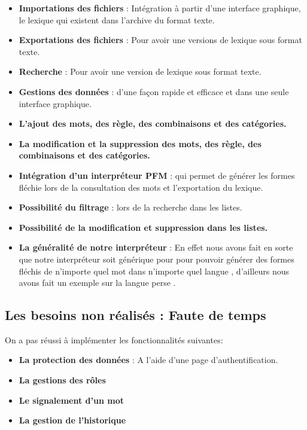 \documentclass[12pt,a4paper]{article}
\begin{document}
\begin{itemize}
\item \textbf{Importations des fichiers} : Intégration à partir d'une interface graphique, le lexique qui existent dans l'archive du format texte.
\item \textbf{Exportations des fichiers} : Pour avoir une versions de lexique sous format texte.
\item \textbf{Recherche} : Pour avoir une version de lexique sous format texte.
\item \textbf{Gestions des données} : d'une façon rapide et efficace et dans une seule interface graphique.


\item \textbf{L'ajout des mots, des règle, des combinaisons et des catégories.}


\item \textbf{ La modification et la suppression des mots, des règle, des combinaisons et des catégories.}
\item \textbf{Intégration d'un interpréteur PFM } : qui permet de générer les formes fléchie lors de la consultation des mots et l'exportation du lexique.
\item \textbf{Possibilité du filtrage} : lors de la recherche dans les listes.
\item \textbf{Possibilité de la modification et suppression dans les listes.}
\item \textbf{La généralité de notre interpréteur} : En effet nous avons fait en sorte que notre interpréteur soit générique pour pour pouvoir générer des formes fléchis de n'importe quel mot dans n'importe quel langue , d'ailleurs nous avons fait un exemple sur la langue perse .
\end{itemize}


\subsection{Les besoins non réalisés : Faute de temps}

On a pas réussi à implémenter les  fonctionnalités suivantes:

\begin{itemize}
\item \textbf{La protection des données } : A l'aide d'une page d'authentification.
\item \textbf{La gestions des rôles }
\item \textbf{Le signalement d'un mot}
\item \textbf{La gestion de l'historique}
\end{itemize}
\end{document}
